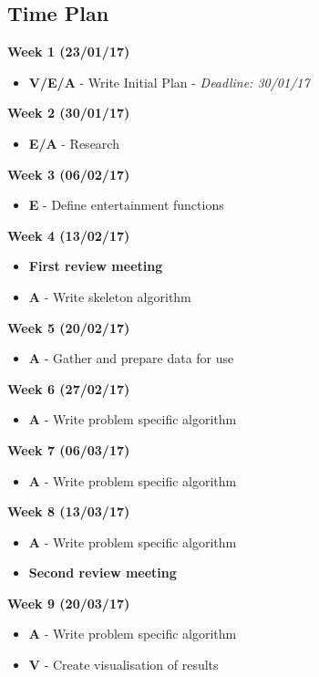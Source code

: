 \documentclass[12pt]{report}
\begin{document}
\subsection*{Time Plan}

\textbf{Week 1 (23/01/17)}
\begin{itemize}
\item \textbf{V/E/A} - Write Initial Plan - \textit{Deadline: 30/01/17}
\end{itemize}

\textbf{Week 2 (30/01/17)}
\begin{itemize}
\item \textbf{E/A} - Research
\end{itemize}

\textbf{Week 3 (06/02/17)}
\begin{itemize}
\item \textbf{E} - Define entertainment functions
\end{itemize}

\textbf{Week 4 (13/02/17)}
\begin{itemize}
\item \textbf{First review meeting}
\item \textbf{A} - Write skeleton algorithm
\end{itemize}

\textbf{Week 5 (20/02/17)}
\begin{itemize}
\item \textbf{A} - Gather and prepare data for use
\end{itemize}

\textbf{Week 6 (27/02/17)}
\begin{itemize}
\item \textbf{A} - Write problem specific algorithm
\end{itemize}

\textbf{Week 7 (06/03/17)}
\begin{itemize}
\item \textbf{A} - Write problem specific algorithm
\end{itemize}

\textbf{Week 8 (13/03/17)}
\begin{itemize}
\item \textbf{A} - Write problem specific algorithm
\item \textbf{Second review meeting}
\end{itemize}

\textbf{Week 9 (20/03/17)}
\begin{itemize}
\item \textbf{A} - Write problem specific algorithm
\item \textbf{V} - Create visualisation of results
\end{itemize}
\end{document}
